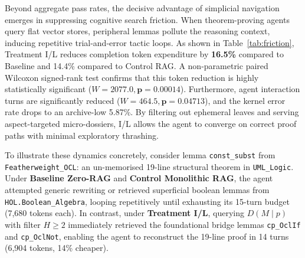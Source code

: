 \documentclass{svproc}
\begin{document}
Beyond aggregate pass rates, the decisive advantage of simplicial navigation emerges in suppressing cognitive search friction. When theorem-proving agents query flat vector stores, peripheral lemmas pollute the reasoning context, inducing repetitive trial-and-error tactic loops. As shown in Table~\ref{tab:friction}, Treatment I/L reduces completion token expenditure by \textbf{16.5\%} compared to Baseline and 14.4\% compared to Control RAG. A non-parametric paired Wilcoxon signed-rank test confirms that this token reduction is highly statistically significant ($W = 2077.0, \mathbf{p = 0.00014}$). Furthermore, agent interaction turns are significantly reduced ($W = 464.5, \mathbf{p = 0.04713}$), and the kernel error rate drops to an archive-low 5.87\%. By filtering out ephemeral leaves and serving aspect-targeted micro-dossiers, I/L allows the agent to converge on correct proof paths with minimal exploratory thrashing.

\begin{table}[t!]
\centering
\caption{Trajectory search friction metrics across successful proofs (paired Wilcoxon tests).}
\label{tab:friction}
\end{table}

To illustrate these dynamics concretely, consider lemma \texttt{const\_subst} from \texttt{Featherweight\_OCL}: an un-memorised 19-line structural theorem in \texttt{UML\_Logic}. Under \textbf{Baseline Zero-RAG} and \textbf{Control Monolithic RAG}, the agent attempted generic rewriting or retrieved superficial boolean lemmas from \texttt{HOL.\allowbreak Boolean\_Algebra}, looping repetitively until exhausting its 15-turn budget (7,680 tokens each). In contrast, under \textbf{Treatment I/L}, querying $D(M \mid p)$ with filter $H \ge 2$ immediately retrieved the foundational bridge lemmas \texttt{cp\_OclIf} and \texttt{cp\_OclNot}, enabling the agent to reconstruct the 19-line proof in 14 turns (6,904 tokens, 14\% cheaper).
\end{document}
